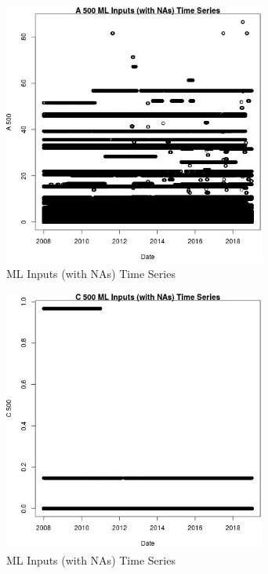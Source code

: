 \begin{figure} 
\centering  
\includegraphics[width=0.77\textwidth]{Code_Outputs/Report_ML_input_PM25_Step4_part_f_de_duplicated_aves_prioritize_24hr_obswNAs_A_500vDate.jpg} 
\caption{\label{fig:Report_ML_input_PM25_Step4_part_f_de_duplicated_aves_prioritize_24hr_obswNAsA_500vDate}ML Inputs (with NAs) Time Series} 
\end{figure} 
 

\begin{figure} 
\centering  
\includegraphics[width=0.77\textwidth]{Code_Outputs/Report_ML_input_PM25_Step4_part_f_de_duplicated_aves_prioritize_24hr_obswNAs_C_500vDate.jpg} 
\caption{\label{fig:Report_ML_input_PM25_Step4_part_f_de_duplicated_aves_prioritize_24hr_obswNAsC_500vDate}ML Inputs (with NAs) Time Series} 
\end{figure} 
 

